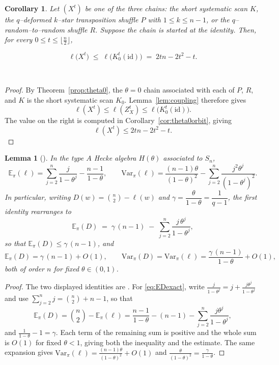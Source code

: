 \documentclass[11pt]{article}
\theoremstyle{plain}  %
\newtheorem{corollary}[theorem]{Corollary}
\newtheorem{lemma}[theorem]{Lemma}
\begin{document}
\begin{corollary}\label{cor:reduce}
Let $(X^{t})$ be one of the three chains: the short systematic scan $K$, the
$q$--deformed $k$--star transposition shuffle $P$ with
$1\leq k\leq n-1$, or the $q$--random--to--random shuffle $R$. Suppose the
chain is started at the identity. Then, for every 
$0\leq t\leq\lfloor \frac{n}{2}\rfloor$,

$$
  \ell\bigl(X^{t}\bigr)
  \;\leq\;
  \ell\bigl(K_{0}^{t}(\mathrm{id})\bigr)
  \;=\;
  2tn-2t^{2}-t.$$  
  \end{corollary}
\
\begin{proof}


By Theorem~\ref{prop:theta0}, the $\theta=0$ chain associated with each of
$P$, $R$, and $K$ is the short systematic scan $K_0$.
Lemma~\ref{lem:coupling} therefore gives
\[
\ell(X^t)\le \ell(Z^t_X) \le \ell\bigl(K_0^t(\mathrm{id})\bigr) .
\]
The value on the right is computed in Corollary~\ref{cor:theta0orbit}, giving
\[
\ell(X^t)\le 2tn-2t^2-t.
\]
\end{proof}


\begin{lemma}[{\cite[Equation 2.13]{DiaconisRam2000}}]\label{lem:statistics}
In the type $A$ Hecke algebra $H(\theta)$ associated to $S_n$,
$$
  \mathbb{E}_\pi(\ell) = \sum_{j=2}^{n}\frac{j}{1-\theta^{j}} - \frac{n-1}{1-\theta},
  \qquad
  \mathrm{Var}_\pi(\ell) = \frac{(n-1)\theta}{(1-\theta)^{2}}
      - \sum_{j=2}^{n}\frac{j^{2}\theta^{j}}{(1-\theta^{j})^{2}} .
$$
In particular, writing $D(w) = \binom n2 - \ell(w)$ and
$\gamma = \dfrac{\theta}{1-\theta} = \dfrac{1}{q-1}$, the first identity rearranges to
\begin{equation}\label{eq:EDexact}
  \mathbb{E}_\pi(D)
  \;=\; \gamma\,(n-1) \;-\; \sum_{j=2}^{n}\frac{j\,\theta^{j}}{1-\theta^{j}} ,
\end{equation}
so that $\mathbb{E}_\pi(D) \le \gamma\,(n-1)$, and
$$
  \mathbb{E}_\pi(D) = \gamma\,(n-1) + O(1),
  \qquad
  \mathrm{Var}_\pi(D) = \mathrm{Var}_\pi(\ell)
    = \frac{\gamma\,(n-1)}{1-\theta} + O(1),
$$
both of order $n$ for fixed $\theta \in (0,1)$.
\end{lemma}

\begin{proof}
The two displayed identities are \cite[Equation 2.13]{DiaconisRam2000}. For
\eqref{eq:EDexact}, write $\frac{j}{1-\theta^{j}} = j + \frac{j\theta^{j}}{1-\theta^{j}}$
and use $\sum_{j=2}^{n} j = \binom n2 + n - 1$, so that
$$
  \mathbb{E}_\pi(D)
  = \binom n2 - \mathbb{E}_\pi(\ell)
  = \frac{n-1}{1-\theta} - (n-1) - \sum_{j=2}^{n}\frac{j\theta^{j}}{1-\theta^{j}} ,
$$
and $\frac{1}{1-\theta}-1 = \gamma$. Each term of the remaining sum is positive and the
whole sum is $O(1)$ for fixed $\theta<1$, giving both the inequality and the estimate. The
same expansion gives $\mathrm{Var}_\pi(\ell) = \frac{(n-1)\theta}{(1-\theta)^{2}}+O(1)$ and
$\frac{\theta}{(1-\theta)^{2}} = \frac{\gamma}{1-\theta}$.
\end{proof}
\end{document}
